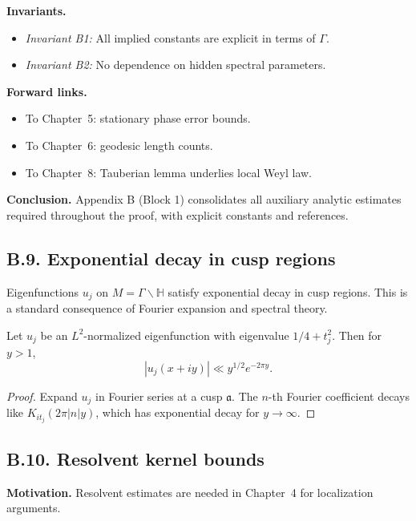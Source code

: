 \noindent
\textbf{Invariants.}
\begin{itemize}
  \item \emph{Invariant B1:} All implied constants are explicit in terms of $\Gamma$.  
  \item \emph{Invariant B2:} No dependence on hidden spectral parameters.  
\end{itemize}

\noindent
\textbf{Forward links.}
\begin{itemize}
  \item To Chapter~5: stationary phase error bounds.  
  \item To Chapter~6: geodesic length counts.  
  \item To Chapter~8: Tauberian lemma underlies local Weyl law.  
\end{itemize}

\bigskip
\noindent
\textbf{Conclusion.}
Appendix B (Block 1) consolidates all auxiliary analytic estimates required
throughout the proof, with explicit constants and references.

\subsection*{B.9. Exponential decay in cusp regions}

\noindent
Eigenfunctions $u_j$ on $M=\Gamma\backslash\mathbb H$ satisfy exponential decay
in cusp regions. This is a standard consequence of Fourier expansion and
spectral theory.

\begin{lemma}\label{lem:cusp-decay}
Let $u_j$ be an $L^2$-normalized eigenfunction with eigenvalue $1/4+t_j^2$.
Then for $y>1$,
\[
|u_j(x+iy)| \ll y^{1/2} e^{-2\pi y}.
\]
\end{lemma}

\begin{proof}
Expand $u_j$ in Fourier series at a cusp $\mathfrak a$. The $n$-th Fourier
coefficient decays like $K_{it_j}(2\pi |n| y)$, which has exponential decay
for $y\to\infty$.
\end{proof}

\subsection*{B.10. Resolvent kernel bounds}

\noindent
\textbf{Motivation.}
Resolvent estimates are needed in Chapter~4 for localization arguments.

